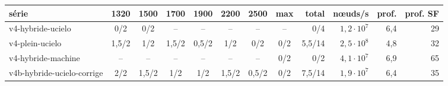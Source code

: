 \begin{tabular}{lcccccccrrrr}
\toprule
série & 1320 & 1500 & 1700 & 1900 & 2200 & 2500 & max & total & nœuds/s & prof. & prof. SF\\
\midrule
v4-hybride-ucielo & 0/2 & 0/2 & -- & -- & -- & -- & -- & 0/4 & $1{,}2\cdot 10^{7}$ & 6{,}4 & 29\\
v4-plein-ucielo & 1{,}5/2 & 1/2 & 1{,}5/2 & 0{,}5/2 & 1/2 & 0/2 & 0/2 & 5{,}5/14 & $2{,}5\cdot 10^{8}$ & 4{,}8 & 32\\
v4-hybride-machine & -- & -- & -- & -- & -- & -- & 0/2 & 0/2 & $4{,}1\cdot 10^{7}$ & 6{,}9 & 65\\
v4b-hybride-ucielo-corrige & 2/2 & 1{,}5/2 & 1/2 & 1/2 & 1{,}5/2 & 0{,}5/2 & 0/2 & 7{,}5/14 & $1{,}9\cdot 10^{7}$ & 6{,}4 & 35\\
\bottomrule
\end{tabular}
